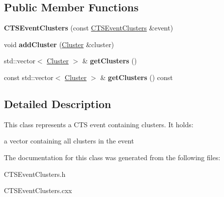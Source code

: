 \subsection*{Public Member Functions}
\begin{DoxyCompactItemize}
\item 
\mbox{\label{classCTSEventClusters_aa9ea39617fef98537e5f997052138e74}} 
{\bfseries C\+T\+S\+Event\+Clusters} (const \hyperlink{classCTSEventClusters}{C\+T\+S\+Event\+Clusters} \&event)
\item 
\mbox{\label{classCTSEventClusters_a6c0b9fb135b957df0f907a1f32f27ec1}} 
void {\bfseries add\+Cluster} (\hyperlink{classCluster}{Cluster} \&cluster)
\item 
\mbox{\label{classCTSEventClusters_a885d19a07e71bb3e91b488449af10b5c}} 
std\+::vector$<$ \hyperlink{classCluster}{Cluster} $>$ \& {\bfseries get\+Clusters} ()
\item 
\mbox{\label{classCTSEventClusters_a405d7e8bad65c7371fd4855aaebfce84}} 
const std\+::vector$<$ \hyperlink{classCluster}{Cluster} $>$ \& {\bfseries get\+Clusters} () const
\end{DoxyCompactItemize}


\subsection{Detailed Description}
This class represents a C\+TS event containing clusters. It holds\+:
\begin{DoxyItemize}
\item a vector containing all clusters in the event 
\end{DoxyItemize}

The documentation for this class was generated from the following files\+:\begin{DoxyCompactItemize}
\item 
C\+T\+S\+Event\+Clusters.\+h\item 
C\+T\+S\+Event\+Clusters.\+cxx\end{DoxyCompactItemize}
